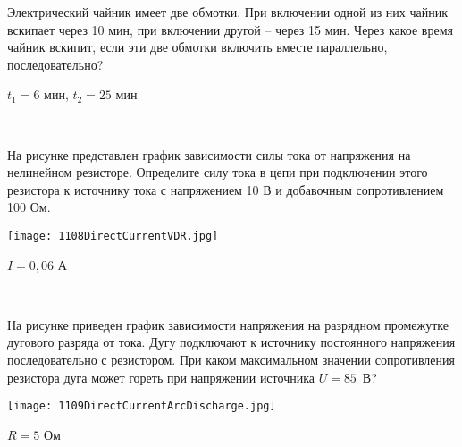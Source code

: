 \begin{ex}
Электрический чайник имеет две обмотки. При включении одной из них чайник вскипает через 10 мин, при включении другой -- через 15 мин. 
Через какое время чайник вскипит, если эти две обмотки включить вместе параллельно, последовательно?
\begin{ans}
$t_1 = 6$ мин, $t_2 = 25$ мин
\end{ans}
\end{ex}

\begin{ex}
\hspace{0pt} \\
\begin{minipage}{.65\textwidth}
На рисунке представлен график зависимости силы тока от напряжения на нелинейном резисторе. 
Определите силу тока в цепи при подключении этого резистора к источнику тока с напряжением 10 В и добавочным сопротивлением 100 Ом.
\end{minipage}
\begin{minipage}{.35\textwidth}
\centering
\texttt{[image: 1108DirectCurrentVDR.jpg]}
\end{minipage}
\begin{ans}
$I = 0,06$ А
\end{ans}
\end{ex}

\begin{ex}
\hspace{0pt} \\
\begin{minipage}{.65\textwidth}
На рисунке приведен график зависимости напряжения на разрядном промежутке дугового разряда от тока. Дугу подключают  к источнику постоянного напряжения последовательно с резистором. 
При каком максимальном значении сопротивления резистора дуга может гореть при напряжении источника $U =85$~В?
\end{minipage}
\begin{minipage}{.35\textwidth}
\centering
\texttt{[image: 1109DirectCurrentArcDischarge.jpg]}
\end{minipage}
\begin{ans}
$R = 5$ Ом
\end{ans}
\end{ex}

